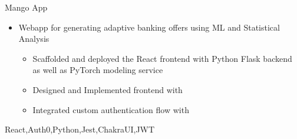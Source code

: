 %
%
%


\begin{projects}
	\project
	{Mango App}{ }
	{}
	{\begin{itemize}
        \setlength\itemsep{0.2em}
        \item{Webapp for generating adaptive banking offers using ML and Statistical Analysis}
        \begin{itemize}
            \setlength\itemsep{0.2em}
            \item{Scaffolded and deployed the React frontend with Python Flask backend as well as PyTorch modeling service}
            \item{Designed and Implemented frontend with }
            \item{Integrated custom authentication flow with }
        \end{itemize}   
      \end{itemize}
    }
	{React,Auth0,Python,Jest,ChakraUI,JWT}
\end{projects}
